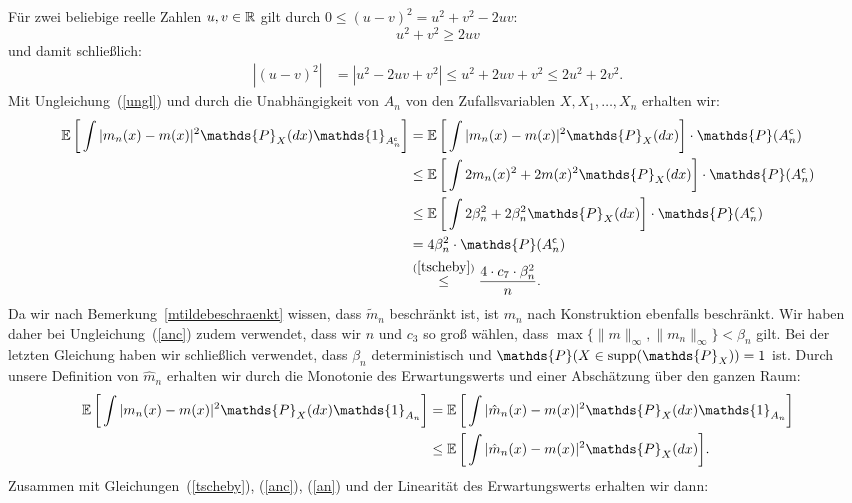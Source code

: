 Für zwei beliebige reelle Zahlen $u, v \in \mathbb{R}$ gilt durch $0 \leq (u - v)^2 = u^2 + v^2 - 2uv$:
$$u^2 + v^2 \geq 2uv$$ und damit schließlich:
\begin{equation}
\label{ungl}
\begin{split}
|(u - v)^2| & = |u^2 - 2uv + v^2|
\leq  u^2 + 2uv + v^2
\leq 2u^2 + 2v^2.
\end{split}
\end{equation}
Mit Ungleichung~(\ref{ungl}) und durch die Unabhängigkeit von $A_n$ von den Zufallsvariablen $X, X_1, \dots, X_n$ erhalten wir:
\begin{equation}
\label{anc}
\begin{split}
 \E \bigg[\int |m_n(x) - m(x)|^2 \mathds{P}_X(dx) \mathds{1}_{A_n^{\mathsf{c}}}\bigg] & =  \E \bigg[\int |m_n(x) - m(x)|^2 \mathds{P}_X(dx) \bigg] \cdot \mathds{P}(A_n^{\mathsf{c}}) \\
 & \leq \E \bigg[\int 2m_n(x)^2 + 2m(x)^2 \mathds{P}_X(dx)\bigg] \cdot \mathds{P}(A_n^{\mathsf{c}})\\
 & \leq \E \bigg[\int  2\beta_n^2 + 2\beta_n^2 \mathds{P}_X(dx)\bigg] \cdot \mathds{P}(A_n^{\mathsf{c}})\\
 & = 4\beta_n^2 \cdot \mathds{P}(A_n^{\mathsf{c}}) \\
 & \stackrel{(\ref{tscheby})}{\leq} \frac{4 \cdot c_7 \cdot \beta_n^2}{n}.
\end{split}
\end{equation}
Da wir nach Bemerkung~\ref{mtildebeschraenkt} wissen, dass $\tilde{m}_n$ beschränkt ist, ist $m_n$ nach Konstruktion ebenfalls beschränkt. Wir haben daher bei Ungleichung~(\ref{anc}) zudem verwendet, dass wir $n$ und $c_3$ so groß wählen, dass $\max\{\|m\|_{\infty}, \|m_n\|_{\infty}\} < \beta_n$ gilt. Bei der letzten Gleichung haben wir schließlich verwendet, dass $\beta_n$ deterministisch und $\mathds{P}(X \in \supp(\mathds{P}_X)) = 1$ ist.
Durch unsere Definition von $\hat{m}_n$ erhalten wir durch die Monotonie des Erwartungswerts und einer Abschätzung über den ganzen Raum:
\begin{equation}
\label{an}
\begin{split}
\E \bigg[\int |m_n(x) - m(x)|^2 \mathds{P}_X(dx) \mathds{1}_{A_n}\bigg] & = \E \bigg[\int |\hat{m}_n(x) - m(x)|^2 \mathds{P}_X(dx) \mathds{1}_{A_n}\bigg] \\
& \leq \E \bigg[\int |\hat{m}_n(x) - m(x)|^2 \mathds{P}_X(dx)\bigg].
\end{split}
\end{equation}
Zusammen mit Gleichungen~(\ref{tscheby}), (\ref{anc}), (\ref{an}) und der Linearität des Erwartungswerts erhalten wir dann:

